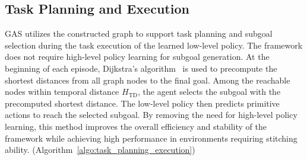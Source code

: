 \documentclass{article}
\begin{document}
\subsection{Task Planning and Execution}
GAS utilizes the constructed graph to support task planning and subgoal selection during the task execution of the learned low-level policy. The framework does not require high-level policy learning for subgoal generation. At the beginning of each episode, Dijkstra’s algorithm~\cite{dijkstra1959note} is used to precompute the shortest distances from all graph nodes to the final goal. Among the reachable nodes within temporal distance \( H_{\text{TD}} \), the agent selects the subgoal with the precomputed shortest distance. The low-level policy then predicts primitive actions to reach the selected subgoal. By removing the need for high-level policy learning, this method improves the overall efficiency and stability of the framework while achieving high performance in environments requiring stitching ability. (Algorithm~\ref{algo:task_planning_execution})
\end{document}
